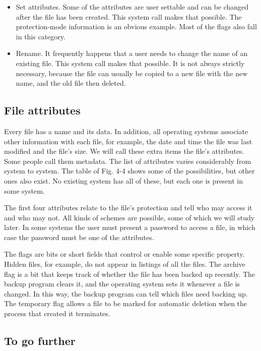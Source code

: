 \begin{itemize}
    \item Set attributes. Some of the attributes are user settable and can be changed after the file has been created. This system call makes that possible. The protection-mode information is an obvious example. Most of the flags also fall in this category.
    \item Rename. It frequently happens that a user needs to change the name of an existing file. This system call makes that possible. It is not always strictly necessary, because the file can usually be copied to a new file with the new name, and the old file then deleted.
\end{itemize}


\subsection{File attributes}%

Every file has a name and its data. In addition, all operating systems associate
other information with each file, for example, the date and time the file was last
modified and the file’s size. We will call these extra items the file’s attributes.
Some people call them metadata. The list of attributes varies considerably from
system to system. The table of Fig. 4-4 shows some of the possibilities, but other
ones also exist. No existing system has all of these, but each one is present in
some system.

The first four attributes relate to the file’s protection and tell who may access it
and who may not. All kinds of schemes are possible, some of which we will study
later. In some systems the user must present a password to access a file, in which
case the password must be one of the attributes.

The flags are bits or short fields that control or enable some specific property.
Hidden files, for example, do not appear in listings of all the files. The archive flag
is a bit that keeps track of whether the file has been backed up recently. The backup
program clears it, and the operating system sets it whenever a file is changed.
In this way, the backup program can tell which files need backing up. The temporary
flag allows a file to be marked for automatic deletion when the process that
created it terminates.

\subsection{To go further}


